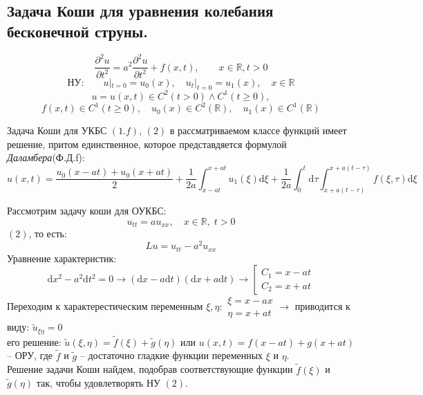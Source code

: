 \subsection{Задача Коши для уравнения колебания бесконечной струны.}
\begin{equation}
	\frac{\partial^2 u}{\partial t^2}=a^2\frac{\partial^2 u}{\partial t^2}+f(x,t),\qquad x\in\mathbb{R},t>0
	\tag{$1,f$}
\end{equation}
\begin{equation}
	\text{НУ:}\qquad u|_{t=0}= u_0(x),\quad u_t|_{t=0}=u_1(x),\quad x \in \mathbb{R}
	\tag{2}
\end{equation}
$$ u=u(x,t)\in C^2(t>0) \land C^1(t\ge0),$$
$$f(x,t)\in C^1(t\ge0),\quad u_0(x)\in C^2(\mathbb R),\quad u_1(x)\in C^1(\mathbb R) $$
\begin{theorem}
	Задача Коши для УКБС $(1.f),\,(2)$ в рассматриваемом классе функций имеет решение, притом единственное, которое представдяется
	формулой \emph{Даламбера}(Ф.Д.f):
	$$
		u(x,t)=\frac{u_0(x-at)+u_0(x+at)}2 +\frac{1}{2a} \int^{x+at}_{x-at}u_1(\xi)\mathrm{d}\xi+
		\frac{1}{2a}\int^t_0\mathrm d\tau \int^{x+a(t-\tau)}_{x+a(t-\tau)}f(\xi,\tau)\mathrm d\xi
	$$
\end{theorem}
Рассмотрим задачу коши для ОУКБС:
\begin{equation}
	u_{tt}= au_{xx},\quad x \in \mathbb{R},\;t>0
	\tag{1.o}
\end{equation}
$(2)$, то есть:
$$Lu=u_{tt}-a^2u_{xx}$$
Уравнение характеристик:
\begin{equation}
	\mathrm d x^2-a^2\mathrm dt^2=0\rightarrow (\mathrm d x-a\mathrm d t)(\mathrm d x+a\mathrm d t)\rightarrow
	\left[ \begin{array}{ll}
		C_1=x-at \\
		C_2=x+at
	\end{array} \right.
	\tag*{--- первые интеграллы}
\end{equation}
Переходим к характерестическим переменным $\displaystyle\xi,\eta:\begin{array}{ll}\xi=x-ax\\\eta=x+at\end{array}\rightarrow$
приводится к виду: $\tilde u_{\xi\eta}=0$\\%
его решение: $\displaystyle \tilde u(\xi,\eta)=\tilde f(\xi)+\tilde g(\eta)$ или $u(x,t)=f(x-at)+g(x+at)$ -- ОРУ,
где $\tilde f$ и $\tilde g$ -- достаточно гладкие функции переменных $\xi$ и $\eta$.\\
Решение задачи Коши найдем, подобрав соответствующие функции $\tilde f(\xi)$ и $\tilde g(\eta)$ так, чтобы удовлетворять НУ $(2)$.\\
